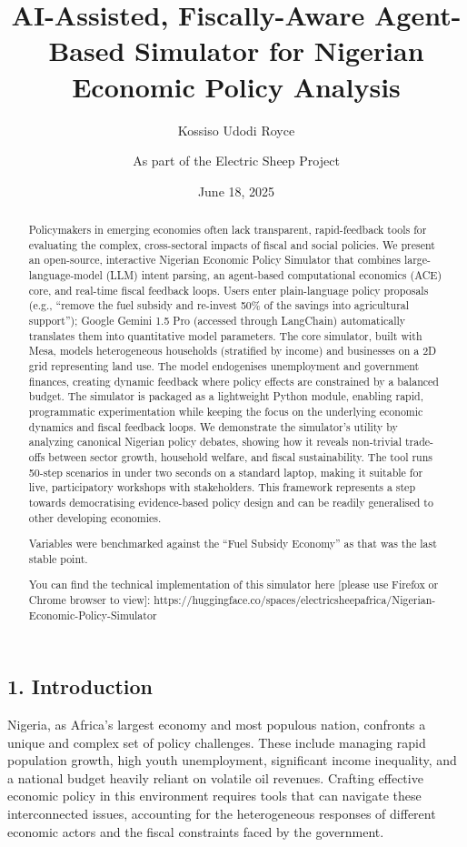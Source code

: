 \documentclass[
]{article}
\title{AI-Assisted, Fiscally-Aware Agent-Based Simulator for Nigerian
Economic Policy Analysis}
\author{Kossiso Udodi Royce \and As part of the Electric Sheep Project}
\date{June 18, 2025}
\begin{document}
\maketitle
\begin{abstract}
Policymakers in emerging economies often lack transparent,
rapid-feedback tools for evaluating the complex, cross-sectoral impacts
of fiscal and social policies. We present an open-source, interactive
Nigerian Economic Policy Simulator that combines large-language-model
(LLM) intent parsing, an agent-based computational economics (ACE) core,
and real-time fiscal feedback loops. Users enter plain-language policy
proposals (e.g., ``remove the fuel subsidy and re-invest 50\% of the
savings into agricultural support''); Google Gemini 1.5 Pro (accessed
through LangChain) automatically translates them into quantitative model
parameters. The core simulator, built with Mesa, models heterogeneous
households (stratified by income) and businesses on a 2D grid
representing land use. The model endogenises unemployment and government
finances, creating dynamic feedback where policy effects are constrained
by a balanced budget. The simulator is packaged as a lightweight Python
module, enabling rapid, programmatic experimentation while keeping the
focus on the underlying economic dynamics and fiscal feedback loops. We
demonstrate the simulator's utility by analyzing canonical Nigerian
policy debates, showing how it reveals non-trivial trade-offs between
sector growth, household welfare, and fiscal sustainability. The tool
runs 50-step scenarios in under two seconds on a standard laptop, making
it suitable for live, participatory workshops with stakeholders. This
framework represents a step towards democratising evidence-based policy
design and can be readily generalised to other developing economies.

Variables were benchmarked against the ``Fuel Subsidy Economy'' as that
was the last stable point.

You can find the technical implementation of this simulator here
{[}please use Firefox or Chrome browser to view{]}:
https://huggingface.co/spaces/electricsheepafrica/Nigerian-Economic-Policy-Simulator
\end{abstract}

\subsection{1. Introduction}\label{introduction}

Nigeria, as Africa's largest economy and most populous nation, confronts
a unique and complex set of policy challenges. These include managing
rapid population growth, high youth unemployment, significant income
inequality, and a national budget heavily reliant on volatile oil
revenues. Crafting effective economic policy in this environment
requires tools that can navigate these interconnected issues, accounting
for the heterogeneous responses of different economic actors and the
fiscal constraints faced by the government.
\end{document}
